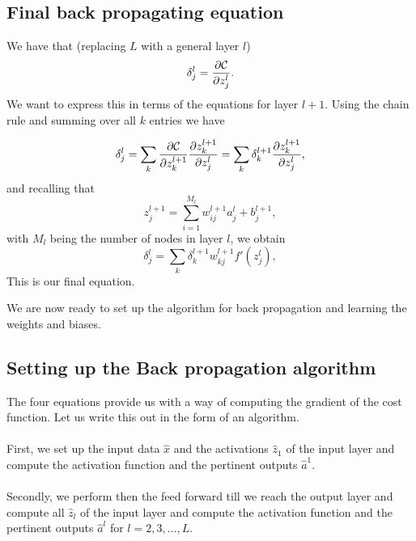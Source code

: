 \documentclass[%
oneside,                 %
final,                   %
10pt]{article}
\begin{document}
\subsection{Final back propagating equation}

We have that (replacing $L$ with a general layer $l$)
\[
\delta_j^l =\frac{\partial {\cal C}}{\partial z_j^l}.
\]
We want to express this in terms of the equations for layer $l+1$. Using the chain rule and summing over all $k$ entries we have

\[
\delta_j^l =\sum_k \frac{\partial {\cal C}}{\partial z_k^{l+1}}\frac{\partial z_k^{l+1}}{\partial z_j^{l}}=\sum_k \delta_k^{l+1}\frac{\partial z_k^{l+1}}{\partial z_j^{l}},
\]
and recalling that
\[
z_j^{l+1} = \sum_{i=1}^{M_{l}}w_{ij}^{l+1}a_j^{l}+b_j^{l+1},
\]
with $M_l$ being the number of nodes in layer $l$, we obtain
\[
\delta_j^l =\sum_k \delta_k^{l+1}w_{kj}^{l+1}f'(z_j^l),
\]
This is our final equation.

We are now ready to set up the algorithm for back propagation and learning the weights and biases.

\subsection{Setting up the Back propagation algorithm}



The four equations  provide us with a way of computing the gradient of the cost function. Let us write this out in the form of an algorithm.


\paragraph{}
First, we set up the input data $\hat{x}$ and the activations
$\hat{z}_1$ of the input layer and compute the activation function and
the pertinent outputs $\hat{a}^1$.




\paragraph{}
Secondly, we perform then the feed forward till we reach the output
layer and compute all $\hat{z}_l$ of the input layer and compute the
activation function and the pertinent outputs $\hat{a}^l$ for
$l=2,3,\dots,L$.
\end{document}
